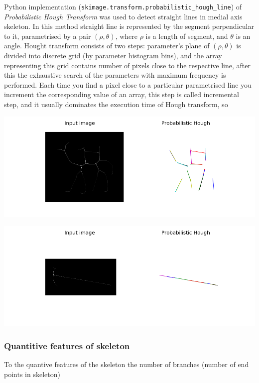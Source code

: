 \documentclass[12pt]{article}
\begin{document}
Python implementation (\texttt{skimage.transform.probabilistic\_hough\_line}) of \textit{Probabilistic Hough Transform} \cite{Kiryati} was used to detect straight lines in medial axis skeleton. In this method straight line is represented by the segment perpendicular to it, parametrised by a pair $(\rho, \theta)$, where $\rho$ is a length of segment, and $\theta$ is an angle. Hought transform consists of two steps: parameter's plane of $(\rho, \theta)$ is divided into discrete grid (by parameter histogram bins), and the array representing this grid contains number of pixels close to the respective line, after this the exhaustive search of the parameters with maximum frequency is performed. Each time you find a pixel close to a particular parametrised line you increment the corresponding value of an array, this step is called incremental step, and it usually dominates the execution time of Hough transform, so 

\includegraphics[scale=0.6]{camel_764.png}
\vspace{12px}

\includegraphics[scale=0.6]{hammer_604.png}

\subsubsection{Quantitive features of skeleton}
To the quantive features of the skeleton the number of branches (number of end points in skeleton)
\end{document}
